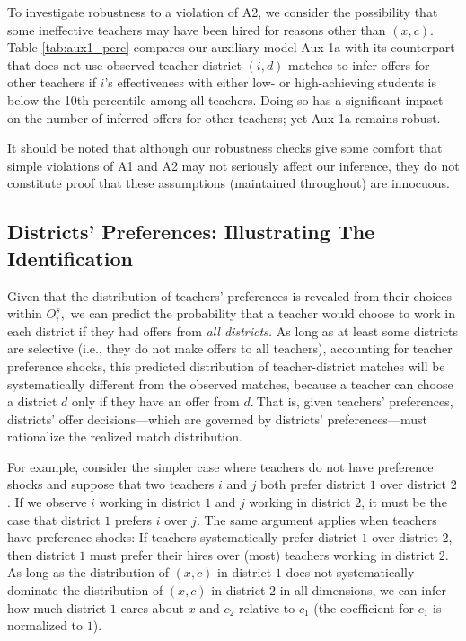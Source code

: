 \documentclass[notitlepage,12pt]{article}%
\begin{document}
To investigate robustness to a violation of A2, we consider the possibility
that some ineffective teachers may have been hired for reasons other than
$(x,c)$. Table \ref{tab:aux1_perc} compares our auxiliary model Aux 1a with
its counterpart that does not use observed teacher-district $\left(
i,d\right)  $ matches to infer offers for other teachers if $i$'s
effectiveness with either low- or high-achieving students is below the 10th
percentile among all teachers. Doing so has a significant impact on the number
of inferred offers for other teachers; yet Aux 1a remains robust.

It should be noted that although our robustness checks give some comfort that
simple violations of A1 and A2 may not seriously affect our inference, they do
not constitute proof that these assumptions (maintained throughout) are innocuous.



\subsection{Districts' Preferences: Illustrating The Identification}

Given that the distribution of teachers' preferences is revealed from their
choices within $O_{i}^{s}$,\ we can predict the probability that a teacher
would choose to work in each district if they had offers from \emph{all
districts.} As long as at least some districts are selective (i.e., they do
not make offers to all teachers), accounting for teacher preference shocks,
this predicted distribution of teacher-district matches will be systematically
different from the observed matches, because a teacher can choose a district
$d$ only if they have an offer from $d.\ $That is, given teachers'
preferences, districts' offer decisions---which are governed by districts'
preferences---must rationalize the realized match distribution.

For example, consider the simpler case where teachers do not have preference
shocks and suppose that two teachers $i$ and $j$ both prefer district $1$ over
district $2$. If we observe $i$ working in district $1$ and $j$ working in
district $2$, it must be the case that district $1$ prefers $i$ over $j.$ The
same argument applies when teachers have preference shocks: If teachers
systematically prefer district $1$ over district $2$, then district $1$ must
prefer their hires over (most) teachers working in district $2.$ As long as
the distribution of $\left(  x,c\right)  $ in district $1$ does not
systematically dominate the distribution of $\left(  x,c\right)  $ in district
$2$ in all dimensions, we can infer how much district $1$ cares about $x$ and
$c_{2}$ relative to $c_{1}$ (the coefficient for $c_{1}$ is normalized to $1$).
\end{document}
